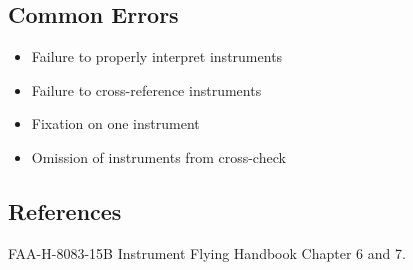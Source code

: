 \subsection{Common Errors}

\begin{itemize}
  \item Failure to properly interpret instruments
  \item Failure to cross-reference instruments
  \item Fixation on one instrument
  \item Omission of instruments from cross-check
\end{itemize}

\subsection{References}

FAA-H-8083-15B Instrument Flying Handbook Chapter 6 and 7.
